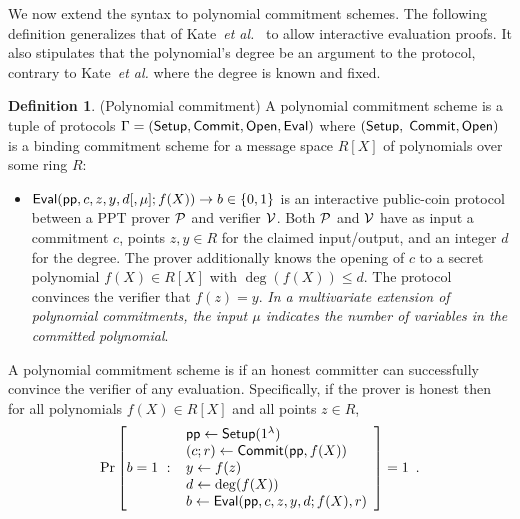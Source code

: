 \documentclass{article}
\theoremstyle{definition}
\newtheorem{definition}{Definition}
\begin{document}
We now extend the syntax to polynomial commitment schemes. The following definition generalizes that of Kate~\emph{et al.}~\cite{AC:KatZavGol10} to allow interactive evaluation proofs. It also stipulates that the polynomial's degree be an argument to the protocol, contrary to Kate~\emph{et al.} where the degree is known and fixed.

\begin{definition} (Polynomial commitment) 
A polynomial commitment scheme is a tuple of protocols $\Gamma = (\textsf{{Setup}}, \textsf{{Commit}}, \textsf{{Open}}, \textsf{{Eval}})$ where $(\textsf{{Setup}},$ $\textsf{{Commit}}, \textsf{{Open}})$ is a binding commitment scheme for a message space $R[X]$ of polynomials over some ring $R$: 

\begin{itemize}
    \item $\textsf{{Eval}}(\textsf{pp}, c, z, y, d[, \mu]; f(X)) \rightarrow b \in \{0, 1\}$ is an interactive public-coin protocol between a PPT prover $\mathcal{P}$ and verifier $\mathcal{V}$. Both $\mathcal{P}$ and $\mathcal{V}$ have as input a commitment $c$, points $z, y \in R$ for the claimed input/output, and an integer $d$ for the degree. The prover additionally knows the opening of $c$ to a secret polynomial $f(X) \in R[X]$ with $\deg(f(X)) \leq d$. The protocol convinces the verifier that $f(z) = y$. \emph{In a multivariate extension of polynomial commitments, the input $\mu$ indicates the number of variables in the committed polynomial}.
   
\end{itemize}

A polynomial commitment scheme is  if an honest committer can successfully convince the verifier of any evaluation. Specifically, if the prover is honest then for all polynomials $f(X) \in R[X]$ and all points $z \in R$,
\[
    \Pr\left[b = 1 \ : \ \begin{array}{l}
        \textsf{pp} \gets \textsf{{Setup}}(1^\lambda) \\
        (c; r) \gets \textsf{{Commit}}(\textsf{pp}, f(X)) \\
        y \gets f(z) \\
        d \gets \deg(f(X)) \\
        b \gets \textsf{{Eval}}(\textsf{pp}, c, z, y, d; f(X), r) \\
    \end{array} \right] = 1 \enspace .
\]


\end{definition}
\end{document}
